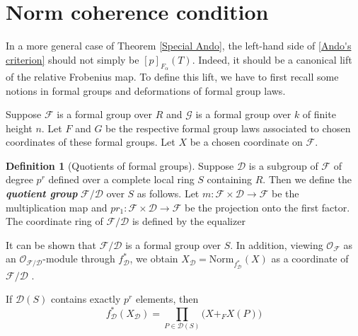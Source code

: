 \documentclass[12pt]{article}
\theoremstyle{definition}
\newtheorem{definition}[theorem]{Definition}
\def\O{\mathcal{O}}
\begin{document}
    \section{Norm coherence condition} \label{norm-coherent conditions}
    In a more general case of Theorem \ref{Special Ando}, the left-hand side of \eqref{Ando's criterion} should not simply be $[p]_{F_\alpha}(T)$. Indeed, it should be a canonical lift of the relative Frobenius map. To define this lift, we have to first recall some notions in formal groups and deformations of formal group laws. \par 
    Suppose $\mathcal{F}$ is a formal group over $R$ and $\mathcal{G}$ is a formal group over $k$ of finite height $n$. Let $F$ and $G$ be the respective formal group laws associated to chosen coordinates of these formal groups. Let $X$ be a chosen coordinate on $\mathcal{F}$. 
    \begin{definition}[Quotients of formal groups] \label{def of quotients of fg}
        Suppose $\mathcal{D}$ is a subgroup of $\mathcal{F}$ of degree $p^r$ defined over a complete local ring $S$ containing $R$. Then we define the \textbf{\em{quotient group}} $\mathcal{F}/\mathcal{D}$ over $S$ as follows. Let $m \colon \mathcal{F} \times \mathcal{D} \to \mathcal{F}$ be the multiplication map and $pr_1 \colon \mathcal{F} \times \mathcal{D} \to \mathcal{F}$ be the projection onto the first factor. The coordinate ring of $\mathcal{F}/\mathcal{D}$ is defined by the equalizer 
        \begin{center}
        \end{center}
        It can be shown that $\mathcal{F}/\mathcal{D}$ is a formal group over $S$. In addition, viewing $\O_\mathcal{F}$ as an $\O_{\mathcal{F}/\mathcal{D}}$-module through $f_\mathcal{D}^*$, we obtain $X_\mathcal{D} = \mbox{Norm}_{f_\mathcal{D}^*}(X)$ as a coordinate of $\mathcal{F}/\mathcal{D}$ \cite[Theorem 19]{Str97}. 
    \end{definition}
    If $\mathcal{D}(S)$ contains exactly $p^r$ elements, then 
    \begin{equation} \label{f_D(X_D) = prod}
        f_\mathcal{D}^*(X_\mathcal{D}) = \prod_{P \in \mathcal{D}(S)}\bigl(X +_F X(P)\bigr)
    \end{equation}
\end{document}
